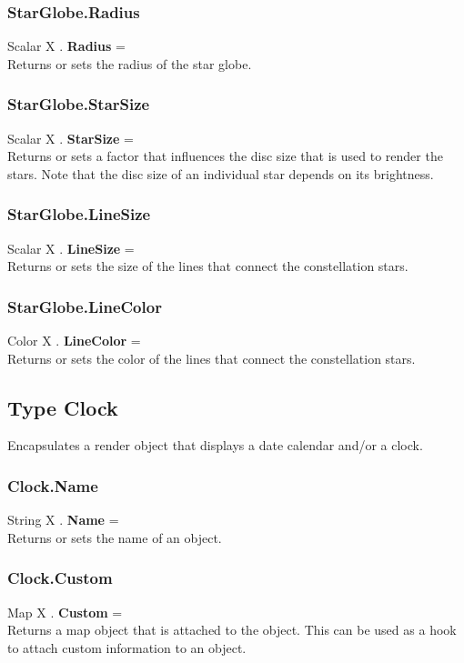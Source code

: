 \subsubsection{StarGlobe.Radius \label{F:StarGlobe:Radius}}
Scalar X . \textbf{Radius} = \\
Returns or sets the radius of the star globe.

\subsubsection{StarGlobe.StarSize \label{F:StarGlobe:StarSize}}
Scalar X . \textbf{StarSize} = \\
Returns or sets a factor that influences the disc size that is used to render the stars. Note that the disc size of an individual star depends on its brightness.

\subsubsection{StarGlobe.LineSize \label{F:StarGlobe:LineSize}}
Scalar X . \textbf{LineSize} = \\
Returns or sets the size of the lines that connect the constellation stars.

\subsubsection{StarGlobe.LineColor \label{F:StarGlobe:LineColor}}
Color X . \textbf{LineColor} = \\
Returns or sets the color of the lines that connect the constellation stars.

\subsection{Type Clock \label{T:Clock}}
Encapsulates a render object that displays a date calendar and/or a clock.

\subsubsection{Clock.Name \label{F:Clock:Name}}
String X . \textbf{Name} = \\
Returns or sets the name of an object.

\subsubsection{Clock.Custom \label{F:Clock:Custom}}
Map X . \textbf{Custom} = \\
Returns a map object that is attached to the object. This can be used as a hook to attach custom information to an object.


